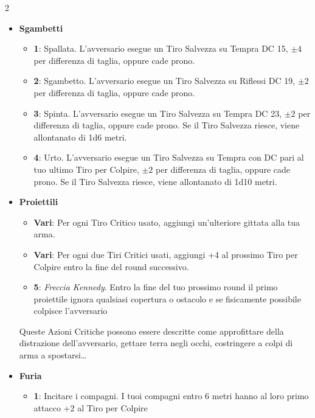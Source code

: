 \begin{multicols}{2}
\begin{itemize}[leftmargin=*]
	\item \textbf{Sgambetti}
	\begin{itemize}[leftmargin=*]
		\setlength{\itemsep}{0pt}
\item \textbf{1}: Spallata. L'avversario esegue un Tiro Salvezza su Tempra DC 15, $ \pm 4 $ per differenza di taglia, oppure cade prono.

\item \textbf{2}: Sgambetto. L'avversario esegue un Tiro Salvezza su Riflessi DC 19, $ \pm 2 $ per differenza di taglia, oppure cade prono.

\item \textbf{3}: Spinta. L'avversario esegue un Tiro Salvezza su Tempra DC 23, $ \pm 2 $ per differenza di taglia, oppure cade prono. Se il Tiro Salvezza riesce, viene allontanato di 1d6 metri.

\item \textbf{4}: Urto. L'avversario esegue un Tiro Salvezza su Tempra con DC pari al tuo ultimo Tiro per Colpire, $ \pm 2 $ per differenza di taglia, oppure cade prono. Se il Tiro Salvezza riesce, viene allontanato di 1d10 metri.
	\end{itemize}

	\item \textbf{Proiettili}
	\begin{itemize}[leftmargin=*]
		\setlength{\itemsep}{0pt}
\item \textbf{Vari}: Per ogni Tiro Critico usato, aggiungi un'ulteriore gittata alla tua arma.

\item \textbf{Vari}: Per ogni due Tiri Critici usati, aggiungi +4 al prossimo Tiro per Colpire entro la fine del round successivo.

		\item \textbf{5}: \emph{Freccia Kennedy}. Entro la fine del tuo prossimo round il primo proiettile ignora qualsiasi copertura o ostacolo e se fisicamente possibile colpisce l'avversario
	\end{itemize}


\begin{narratore}
Queste Azioni Critiche possono essere descritte come approfittare della distrazione dell'avversario, gettare terra negli occhi, costringere a colpi di arma a spostarsi…
\end{narratore}

	\item \textbf{Furia}
	\begin{itemize}[leftmargin=*]
		\setlength{\itemsep}{0pt}
		\item \textbf{1}: Incitare i compagni. I tuoi compagni entro 6 metri hanno al loro primo attacco +2 al Tiro per Colpire


\end{itemize}
\end{itemize}
\end{multicols}
